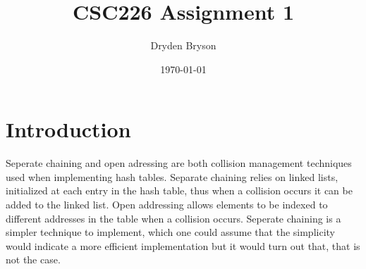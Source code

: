 \documentclass{article}
\title{CSC226 Assignment 1}
\author{Dryden Bryson}
\date{\today}
\begin{document}
\maketitle
\newpage
\section*{Introduction}
Seperate chaining and open adressing are both collision management techniques used when implementing hash tables. Separate chaining relies on linked lists, initialized at each entry in the hash table, thus when a collision occurs it can be added to the linked list. Open addressing allows elements to be indexed to different addresses in the table when a collision occurs. Seperate chaining is a simpler technique to implement, which one could assume that the simplicity would indicate a more efficient implementation but it would turn out that, that is not the case.
\end{document}
